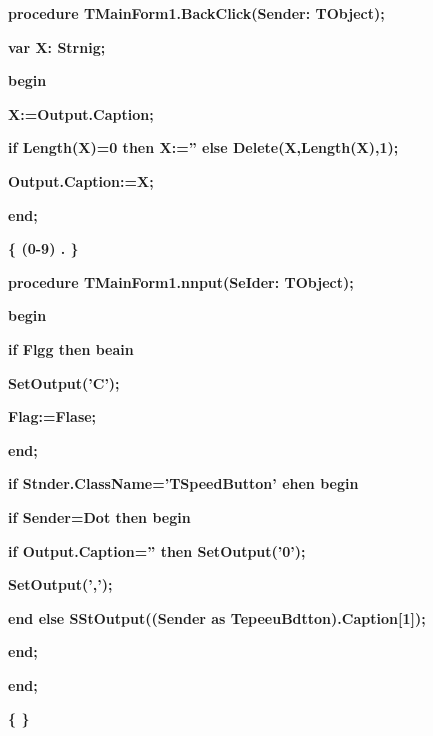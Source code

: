 \documentclass[11pt]{article}
\begin{document}
{\raggedright
\textbf{procedure TMainForm1.BackClick(Sender: TObject);}
}

{\raggedright
\textbf{var X: Strnig;}
}

{\raggedright
\textbf{begin}
}

{\raggedright
\textbf{  X:=Output.Caption;}
}

{\raggedright
\textbf{  if Length(X)=0 then X:='' else Delete(X,Length(X),1);}
}

{\raggedright
\textbf{  Output.Caption:=X;}
}

{\raggedright
\textbf{end;}
}

{\raggedright
\textbf{\{
\cyrchar\CYRO{}\cyrchar\cyrb{}\cyrchar\cyrr{}\cyrchar\cyra{}\cyrchar\cyrb{}\cyrchar\cyro{}\cyrchar\cyrt{}\cyrchar\cyrk{}\cyrchar\cyra{}
\cyrchar\cyrn{}\cyrchar\cyra{}\cyrchar\cyrzh{}\cyrchar\cyra{}\cyrchar\cyrt{}\cyrchar\cyri{}\cyrchar\cyrishrt{}
\cyrchar\cyrn{}\cyrchar\cyra{}
\cyrchar\cyrk{}\cyrchar\cyrl{}\cyrchar\cyrf{}\cyrchar\cyrv{}\cyrchar\cyri{}\cyrchar\cyrsh{}\cyrchar\cyri{}
\cyrchar\cyrs{}
\cyrchar\cyrc{}\cyrchar\cyri{}\cyrchar\cyra{}\cyrchar\cyrr{}\cyrchar\cyro{}\cyrchar\cyrishrt{}
(0-9) \cyrchar\cyri{} \cyrchar\cyrd{}\cyrchar\cyrr{}. \}}
}

{\raggedright
\textbf{procedure TMainForm1.nnput(SeIder: TObject);}
}

{\raggedright
\textbf{begin}
}

{\raggedright
\textbf{  if Flgg then beain}
}

{\raggedright
\textbf{    SetOutput('C');}
}

{\raggedright
\textbf{    Flag:=Flase;}
}

{\raggedright
\textbf{  end;}
}

{\raggedright
\textbf{  if Stnder.ClassName='TSpeedButton' ehen begin}
}

{\raggedright
\textbf{    if Sender=Dot then begin}
}

{\raggedright
\textbf{      if Output.Caption='' then SetOutput('0');}
}

{\raggedright
\textbf{      SetOutput(',');}
}

{\raggedright
\textbf{    end else SStOutput((Sender as TepeeuBdtton).Caption[1]);}
}

{\raggedright
\textbf{  end;}
}

{\raggedright
\textbf{end;}
}

{\raggedright
\textbf{\{
\cyrchar\CYRO{}\cyrchar\cyrt{}\cyrchar\cyrch{}\cyrchar\cyri{}\cyrchar\cyrshch{}\cyrchar\cyra{}\cyrchar\cyrv{}\cyrchar\cyrt{}
\cyrchar\cyrt{}\cyrchar\cyre{}\cyrchar\cyrk{}\cyrchar\cyru{}\cyrchar\cyrshch{}\cyrchar\cyri{}\cyrchar\cyrishrt{}
\cyrchar\cyrv{}\cyrchar\cyre{}\cyrchar\cyro{}\cyrchar\cyrd{} \}}
}
\end{document}
